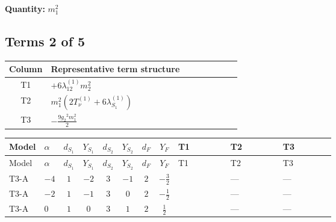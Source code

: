 \documentclass[8pt]{article}
\begin{document}
\begin{landscape}
\begin{longtable}{@{}llcccccc >{\raggedright\arraybackslash}p{0.21\linewidth} >{\raggedright\arraybackslash}p{0.21\linewidth} >{\raggedright\arraybackslash}p{0.21\linewidth}@{}}
\midrule
\bottomrule
\end{longtable}
\clearpage
\noindent\textbf{Quantity: }$m_1^2$\par\smallskip
\subsection*{Terms 2 of 5}
\begin{center}
\begin{tabular}{@{}c >{\raggedright\arraybackslash}p{0.82\linewidth}@{}}
\toprule
Column & Representative term structure \\
\midrule
T1 & \(\displaystyle +6 {\lambda_{12}^{(1)}} {m_2^2}\) \\
\midrule
T2 & \(\displaystyle {m_1^2} (2 T_{\nu}^{(1)}+6 {\lambda_{S_1}^{(1)}})\) \\
\midrule
T3 & \(\displaystyle -\frac{9 {g_2}^2 {m_1^2}}{2}\) \\
\midrule
\bottomrule
\end{tabular}
\end{center}
\smallskip
\tiny
\begin{longtable}{@{}llcccccc >{\raggedright\arraybackslash}p{0.21\linewidth} >{\raggedright\arraybackslash}p{0.21\linewidth} >{\raggedright\arraybackslash}p{0.21\linewidth}@{}}
\toprule
Model & $\alpha$ & $d_{S_1}$ & $Y_{S_1}$ & $d_{S_2}$ & $Y_{S_2}$ & $d_F$ & $Y_F$ & T1 & T2 & T3 \\
\midrule
\endfirsthead
\toprule
Model & $\alpha$ & $d_{S_1}$ & $Y_{S_1}$ & $d_{S_2}$ & $Y_{S_2}$ & $d_F$ & $Y_F$ & T1 & T2 & T3 \\
\midrule
\endhead
T3-A & $-4$ & $1$ & $-2$ & $3$ & $-1$ & $2$ & $-\frac{3}{2}$ & \scriptsize\adjustbox{max width=\linewidth}{$\begin{gathered} +6 {\lambda_{12}^{(1)}} {m_2^2}\end{gathered}$} & --- & --- \\
\midrule
T3-A & $-2$ & $1$ & $-1$ & $3$ & $0$ & $2$ & $-\frac{1}{2}$ & \scriptsize\adjustbox{max width=\linewidth}{$\begin{gathered} +6 {\lambda_{12}^{(1)}} {m_2^2}\end{gathered}$} & --- & --- \\
\midrule
T3-A & $0$ & $1$ & $0$ & $3$ & $1$ & $2$ & $\frac{1}{2}$ & \scriptsize\adjustbox{max width=\linewidth}{$\begin{gathered} +6 {\lambda_{12}^{(1)}} {m_2^2}\end{gathered}$} & --- & --- \\
\midrule

\end{longtable}
\end{landscape}
\end{document}
